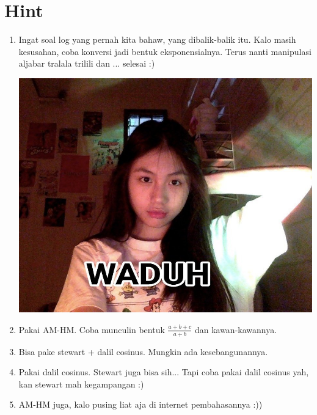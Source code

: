 \documentclass[11pt]{scrartcl}
\begin{document}
        \section{Hint}
        \begin{enumerate}
            \item Ingat soal log yang pernah kita bahaw, yang dibalik-balik itu. Kalo masih kesusahan, coba konversi jadi bentuk eksponensialnya. Terus nanti manipulasi aljabar tralala trilili dan ... selesai :)

            \includegraphics[scale=0.3]{waduh.jpg}

            \item Pakai AM-HM. Coba munculin bentuk $\frac{a+b+c}{a+b}$ dan kawan-kawannya.

            \item Bisa pake stewart + dalil cosinus. Mungkin ada kesebangunannya.

            \item Pakai dalil cosinus. Stewart juga bisa sih... Tapi coba pakai dalil cosinus yah, kan stewart mah kegampangan :)

            \item AM-HM juga, kalo pusing liat aja di internet pembahasannya :)) 
        \end{enumerate}
	
\end{document}
